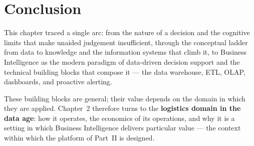 \section*{Conclusion}

This chapter traced a single arc: from the nature of a decision and the cognitive limits that make
unaided judgement insufficient, through the conceptual ladder from data to knowledge and the
information systems that climb it, to Business Intelligence as the modern paradigm of data-driven
decision support and the technical building blocks that compose it --- the data warehouse, ETL, OLAP,
dashboards, and proactive alerting.

These building blocks are general; their value depends on the domain in which they are applied.
Chapter~2 therefore turns to the \textbf{logistics domain in the data age}: how it operates, the
economics of its operations, and why it is a setting in which Business Intelligence delivers particular
value --- the context within which the platform of Part~II is designed.
